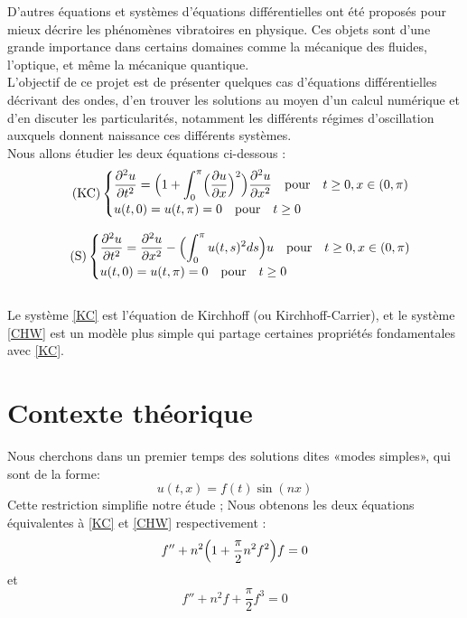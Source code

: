 \documentclass[11pt,a4paper]{article}
\begin{document}
D'autres équations et systèmes d'équations différentielles ont été proposés pour mieux décrire les phénomènes vibratoires en physique. Ces objets sont d'une grande importance dans certains domaines  comme la mécanique des fluides, l'optique, et même la mécanique quantique.\\

L'objectif de ce projet est de présenter quelques cas d'équations différentielles décrivant des ondes, d'en trouver les solutions au moyen d'un calcul numérique et d'en discuter les particularités, notamment les différents régimes d'oscillation auxquels donnent naissance ces différents systèmes.\\
Nous allons étudier les deux équations ci-dessous :
    \begin{equation} \label{KC} \tag{KC}
    \begin{cases} 
    \displaystyle \frac {\partial ^2 u } {\partial t ^2} =  \Bigl( 1+ \int _0^\pi  \Bigl( \frac {\partial u} {\partial x} \Bigr)^2 \Bigr) \frac {\partial ^2 u } {\partial x ^2} \quad  \text{pour}\quad t\ge 0, x\in (0,\pi ) \\ u(t, 0)= u (t, \pi )= 0\quad  \text{pour} \quad t\ge 0
    \end{cases} 
    \end{equation} 



    \begin{equation} \label{CHW} \tag{S}
    \begin{cases} 
    \displaystyle \frac {\partial ^2 u } {\partial t ^2} = \frac {\partial ^2 u } {\partial x ^2} -  \Bigl( \int _0^\pi u(t,s)^2 ds \Bigr) u \quad  \text{pour}\quad t\ge 0, x\in (0,\pi ) \\ u(t, 0)= u (t, \pi )= 0\quad  \text{pour} \quad t\ge 0
    \end{cases} 
    \end{equation} 
    \\
Le système \eqref{KC} est l'équation de Kirchhoff (ou Kirchhoff-Carrier), et le système \eqref{CHW} est un modèle plus simple qui partage certaines propriétés fondamentales avec \eqref{KC}.\\

\section{Contexte théorique}

Nous cherchons dans un premier temps des solutions dites «modes simples», qui sont de la forme:
\begin{equation} \label{UC2} 
u(t, x) = f(t) \sin ( n x )
\end{equation}  
Cette restriction simplifie notre étude ; Nous obtenons les deux équations équivalentes à \eqref{KC} et \eqref{CHW} respectivement : 
\begin{equation} \label{UC1} 
f '' + n^2  \Bigl( 1+  \frac {\pi } {2} n^2  f^2 \Bigr) f=0
\end{equation} 
 et
\begin{equation} \label{UC3} 
f '' + n^2  f +   \frac {\pi } {2}   f^3 =0
\end{equation} \\
\end{document}
